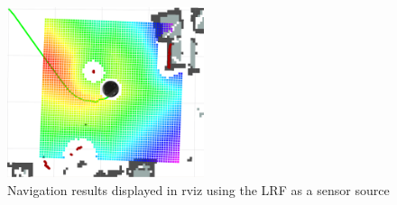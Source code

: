 \begin{figure}[h]
\begin{minipage}[b]{.32\linewidth}
        \includegraphics[height=5cm,width=\linewidth]{imgs/chapter5/scan3.png}
    \end{minipage}
    \caption{Navigation results displayed in rviz using the \ac{LRF} as a sensor source}
    \label{fig:scan_results_chair}
\end{figure}
